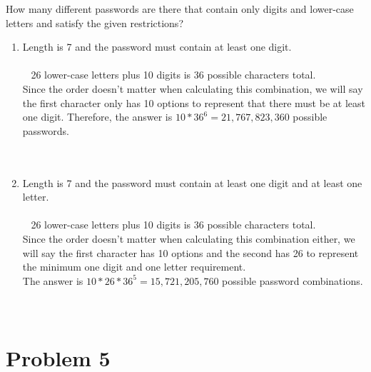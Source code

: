 \documentclass{amsart}
\theoremstyle{definition}
\theoremstyle{Exercise}
\theoremstyle{remark}
\theoremstyle{rule}
\numberwithin{equation}{section}
\begin{document}
\item How many different passwords are there that contain only digits and lower-case letters and satisfy the given restrictions?\\
      \begin{enumerate}[label=(\roman*)]
    \item Length is 7 and the password must contain at least one digit.\\\\\
26 lower-case letters plus 10 digits is 36 possible characters total.\\
Since the order doesn't matter when calculating this combination, we will say the first character only has 10 options to represent that there must be at least one digit. Therefore, the answer is $10 * 36^6 = 21,767,823,360$ possible passwords.
\\\\\
     \item Length is 7 and the password must contain at least one digit and at least one letter.\\\\\
26 lower-case letters plus 10 digits is 36 possible characters total.\\
Since the order doesn't matter when calculating this combination either, we will say the first character has 10 options and the second has 26 to represent the minimum one digit and one letter requirement.\\
The answer is $10 * 26 * 36^5 = 15,721,205,760$ possible password combinations.
\\\\\
    \end{enumerate}
 
 \newpage

\section*{Problem 5}
\end{document}
